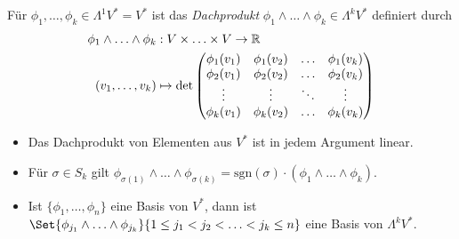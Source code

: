 \documentclass{cheat-sheet}
\theoremstyle{definition}
\let\myBinom\binom
\renewcommand{\binom}[2]{\mathsmaller{\myBinom{#1}{#2}}}
\begin{document}
\iffalse
\begin{nota}
  $\Lambda V^* \coloneqq \oplus_{k=1}^n \Lambda^k V^*$
\end{nota}
\fi

\begin{defn}
  Für $\phi_1, \ldots, \phi_k \in \Lambda^1 V^* = V^*$ ist das \emph{Dachprodukt} $\phi_1 \wedge \ldots \wedge \phi_k \in \Lambda^k V^*$ definiert durch
  \begin{align*}
    \phi_1 \wedge \ldots \wedge \phi_k &: V \times \ldots \times V \to \mathbb{R} \\
    (v_1, \ldots, v_k) &\mapsto \det \begin{pmatrix}
      \phi_1(v_1) & \phi_1(v_2) & \ldots & \phi_1(v_k) \\
      \phi_2(v_1) & \phi_2(v_2) & \ldots & \phi_2(v_k) \\
      \vdots & \vdots & \ddots & \vdots \\
      \phi_k(v_1) & \phi_k(v_2) & \ldots & \phi_k(v_k)
    \end{pmatrix}
  \end{align*}
\end{defn}

\begin{eign}
  \begin{itemize}
    \item Das Dachprodukt von Elementen aus $V^*$ ist in jedem Argument linear.
    \item Für $\sigma \in S_k$ gilt $\phi_{\sigma(1)} \wedge \ldots \wedge \phi_{\sigma(k)} = \mathrm{sgn}(\sigma) \cdot (\phi_1 \wedge \ldots \wedge \phi_k)$.
  \end{itemize}
\end{eign}

\begin{prop}
  \begin{itemize}
    \item Ist $\{ \phi_1, \ldots, \phi_n \}$ eine Basis von $V^*$, dann ist $\Set{ \phi_{j_1} \wedge \ldots \wedge \phi_{j_k} }{ 1 \leq j_1 < j_2 < \ldots < j_k \leq n }$ eine Basis von $\Lambda^k V^*$.

    \vspace{4pt}

  \end{itemize}
\end{prop}
\end{document}
